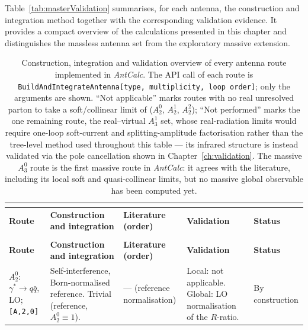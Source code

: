 Table~\ref{tab:masterValidation} summarises, for each antenna, the construction and integration method
together with the corresponding validation evidence. It provides a compact overview of the
calculations presented in this chapter and distinguishes the massless antenna set from
the exploratory massive extension.

{\footnotesize
\renewcommand{\arraystretch}{1.0}
\begin{center}
\begin{longtable}{|>{\raggedright\arraybackslash}p{2.5cm}|>{\raggedright\arraybackslash}p{4.0cm}|>{\raggedright\arraybackslash}p{1.9cm}|>{\raggedright\arraybackslash}p{3.2cm}|>{\raggedright\arraybackslash}p{1.9cm}|}
\caption{Construction, integration and validation overview of every antenna route implemented in \textit{AntCalc}. The API call of each route is \texttt{BuildAndIntegrateAntenna[type, multiplicity, loop order]}; only the arguments are shown. ``Not applicable'' marks routes with no real unresolved parton to take a soft/collinear limit of ($A_2^0$, $A_2^1$, $A_2^2$); ``Not performed'' marks the one remaining route, the real--virtual $A_3^1$ set, whose real-radiation limits would require one-loop soft-current and splitting-amplitude factorisation rather than the tree-level method used throughout this table --- its infrared structure is instead validated via the pole cancellation shown in Chapter~\ref{ch:validation}. The massive $A_3^0$ route is the first massive route in \textit{AntCalc}: it agrees with the literature, including its local soft and quasi-collinear limits, but no massive global observable has been computed yet.}\label{tab:masterValidation}\label{tab:masterValidationConstruction}\label{tab:masterValidationStatus}\\
\hline
\textbf{Route} & \textbf{Construction and integration} & \textbf{Literature (order)} & \textbf{Validation} & \textbf{Status} \\
\hline
\endfirsthead
\multicolumn{5}{l}{\textit{Table~\ref{tab:masterValidation} continued.}}\\
\hline
\textbf{Route} & \textbf{Construction and integration} & \textbf{Literature (order)} & \textbf{Validation} & \textbf{Status} \\
\hline
\endhead
\hline
\endlastfoot
$A_2^0$: $\gamma^*\to q\bar q$, LO; \texttt{[A,2,0]} & Self-interference, Born-normalised reference. Trivial (reference, $A_2^0\equiv1$). & --- (reference normalisation) & Local: not applicable. Global: LO normalisation of the $R$-ratio. & By construction \\ \hline

\end{longtable}
\end{center}}
